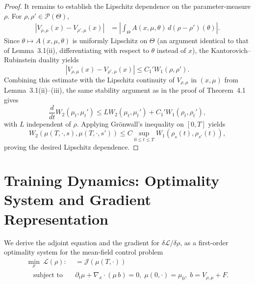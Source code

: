 \documentclass[11pt,a4wide]{article}
\theoremstyle{definition}
\begin{document}
\begin{proof}
It remains to establish the Lipschitz dependence on the parameter-measure $\rho$.
For $\rho,\rho'\in\mathcal P(\Theta)$,
\[
\begin{aligned}
|V_{\rho,\mu}(x)-V_{\rho',\mu}(x)|
&=
\left|
\int_\Theta A(x,\mu,\theta)\,
d(\rho-\rho')(\theta)
\right|.
\end{aligned}
\]
Since $\theta\mapsto A(x,\mu,\theta)$ is uniformly Lipschitz on $\Theta$
(an argument identical to that of Lemma~3.1(ii), differentiating with respect to $\theta$
instead of $x$), the Kantorovich--Rubinstein duality yields
\[
|V_{\rho,\mu}(x)-V_{\rho',\mu}(x)|
\leq
C_1'W_1(\rho,\rho').
\]
Combining this estimate with the Lipschitz continuity of $V_{\rho,\mu}$ in $(x,\mu)$ from
Lemma~3.1(ii)--(iii), the same stability argument as in the proof of
Theorem~4.1 gives
\[
\frac{d}{dt}W_2(\mu_t,\mu_t')
\le
LW_2(\mu_t,\mu_t')
+
C_1'W_1(\rho_t,\rho_t'),
\]
with $L$  independent of $\rho$.
Applying Gr\"onwall's inequality on $[0,T]$ yields
\[
W_2(\mu(T,\cdot,s),\mu(T,\cdot,s'))
\le
C
\sup_{0\le t\le T}
W_1(\rho_s(t),\rho_{s'}(t)),
\]
 proving the desired Lipschitz dependence.
\end{proof}



\section{Training Dynamics: Optimality System and Gradient Representation}
\label{sec:optimality}

We  derive the adjoint  equation and the gradient  for $\delta\mathcal L/\delta\rho$, as a  first-order optimality system for the mean-field control problem
\begin{align*}
 \min_\rho\ \mathcal L(\rho) :& = \mathcal J(\mu(T,\cdot)) \\
 \quad \text{subject to}\quad  & \partial_t\mu + \nabla_x\cdot(\mu\, b) = 0, \;  \mu(0,\cdot)=\mu_0, \;
b=V_{\rho,\mu} +F. 
\end{align*} 
\end{document}
